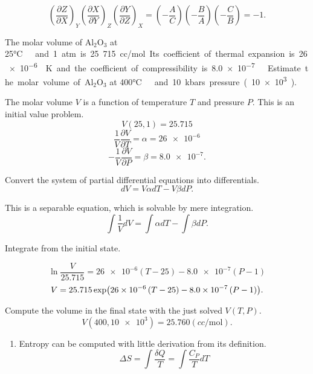 \begin{@empty}
\begin{answer}
    \[
        \left( \frac{\partial Z}{\partial X} \right)_Y
        \left( \frac{\partial X}{\partial Y} \right)_Z
        \left( \frac{\partial Y}{\partial Z} \right)_X
        = \left( -\frac AC \right)
          \left( -\frac BA \right)
          \left( -\frac CB \right)
        = -1.
    \]
\end{answer}

\begin{problem}
    The molar volume of Al$_2$O$_3$ at 25\si\celsius\ and 1 atm is 25.715
    cc/mol.  Its coefficient of thermal expansion is \SI{26e-6}{\per\kelvin}
    and the coefficient of compressibility is \SI{8.0e-7}{\per\atm}.  Estimate
    the molar volume of Al$_2$O$_3$ at 400\si\celsius\ and 10 kbars pressure
    (\SI{10e3}{\atm}).
\end{problem}

\begin{answer}
    The molar volume $V$ is a function of temperature $T$ and pressure $P$.
    This is an initial value problem.
    \[ V(25, 1) = 25.715 \]
    \[ \frac1V \frac{\partial V}{\partial T} = \alpha = \num{26e-6} \]
    \[ -\frac1V \frac{\partial V}{\partial P} = \beta = \num{8.0e-7}.\]

    Convert the system of partial differential equations into differentials.
    \[ dV = V \alpha dT - V \beta dP.\]

    This is a separable equation, which is solvable by mere integration.
    \begin{equation}
        \int \frac1V dV = \int \alpha dT - \int \beta dP. \label{eq:VTP}
    \end{equation}

    Integrate from the initial state.
    \begin{@empty}
        \newcommand{\exponent}{\num{26e-6} \left( T - 25 \right) - \num{8.0e-7} \left( P - 1 \right)}
        \[ \ln \frac{V}{25.715} = \exponent \]
        \[ V = 25.715 \exp \Left( \exponent \Right).\]
    \end{@empty}

    Compute the volume in the final state with the just solved $V(T, P)$.
    \[ V(400, \num{10e3}) = 25.760 \left( \si{cc/\mol} \right).\]
\end{answer}

\begin{problem}
\end{problem}

\begin{answer}
    \begin{enumerate}
        \item Entropy can be computed with little derivation from its
            definition.
            \[ \Delta S = \int \frac{\delta Q}{T} = \int \frac{C_P}{T} dT \]


\end{enumerate}
\end{answer}
\end{@empty}
